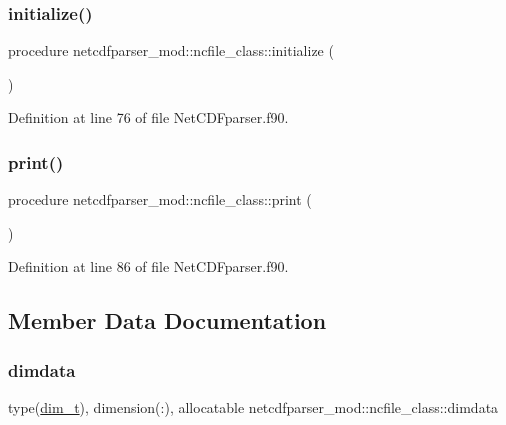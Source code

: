 \subsubsection{\texorpdfstring{initialize()}{initialize()}}
{\footnotesize\ttfamily procedure netcdfparser\+\_\+mod\+::ncfile\+\_\+class\+::initialize (\begin{DoxyParamCaption}{ }\end{DoxyParamCaption})\hspace{0.3cm}{\ttfamily [private]}}



Definition at line 76 of file Net\+C\+D\+Fparser.\+f90.

\mbox{\label{structnetcdfparser__mod_1_1ncfile__class_af7aae078c0672cbfe8e6667311a94dcd}} 
\subsubsection{\texorpdfstring{print()}{print()}}
{\footnotesize\ttfamily procedure netcdfparser\+\_\+mod\+::ncfile\+\_\+class\+::print (\begin{DoxyParamCaption}{ }\end{DoxyParamCaption})\hspace{0.3cm}{\ttfamily [private]}}



Definition at line 86 of file Net\+C\+D\+Fparser.\+f90.



\subsection{Member Data Documentation}
\mbox{\label{structnetcdfparser__mod_1_1ncfile__class_a4dd2f6e32f04a63ad8c3303d76dab84f}} 
\subsubsection{\texorpdfstring{dimdata}{dimdata}}
{\footnotesize\ttfamily type(\mbox{\hyperlink{structnetcdfparser__mod_1_1dim__t}{dim\+\_\+t}}), dimension(\+:), allocatable netcdfparser\+\_\+mod\+::ncfile\+\_\+class\+::dimdata\hspace{0.3cm}{\ttfamily [private]}}



